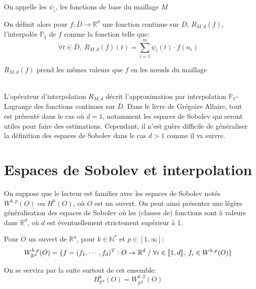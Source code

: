 \begin{remark}
On appelle les $\psi_i$, les fonctions de base du maillage $M$ 
\end{remark}

On définit alors pour $f: \bar{D} \rightarrow \mathbb{R}^d$ une fonction continue sur $D$, $R_{M,d}(f)$, l'interpolée $\mathbb{P}_1$ de $f$
comme la fonction telle que:
\begin{equation}
  \label{ContiInterpol}
  \forall t \in \bar{D}, \; R_{M,d}(f)(t) = \displaystyle\sum_{i=1}^m \psi_i (t)\cdot f(n_i)
\end{equation}

\begin{remark}
  $R_{M,d}(f)$ prend les mêmes valeurs que $f$ en les n\oe uds du maillage
\end{remark}
~\\
L'opérateur d'interpolation $R_{M,d}$ décrit l'approximation par interpolation $\mathbb{P}_1$-Lagrange des fonctions continues sur $\bar{D}$.
Dans le livre de Grégoire Allaire, tout est présenté dans le cas où $d = 1$, notamment les espaces de Sobolev qui seront utiles
pour faire des estimations. Cependant, il n'est guère difficile de généraliser la définition des espaces de Sobolev dans le cas $d > 1$ comme il va suivre.

\section{Espaces de Sobolev et interpolation}

On suppose que le lecteur est familier avec les espaces de Sobolev
notés $W^{k,p}(O)$ ou $H^{k}(O)$, où $O$ est un ouvert. On peut ainsi présenter une légère généralisation des espaces de Sobolev où
les (classes de) fonctions sont à valeurs dans $\mathbb{R}^d$, où $d$ est
éventuellement strictement supérieur à 1.

\begin{definition}
Pour $O$ un ouvert de $\mathbb{R}^n$, pour $k \in \mathbb{N}^{*}$ et $p \in [1,\infty]$:
\begin{equation*}
  W^{k,p}_{\mathbb{R}^d}(O) = \{ f = (f_1, \cdots, f_d)^{T}: O \rightarrow \mathbb{R}^d \; /\; \forall i \in \llbracket 1,d \rrbracket, \; f_i \in W^{k,p}(O) \}\\
\end{equation*}
\end{definition}
\noindent On se servira par la suite surtout de cet ensemble:
\begin{equation*}
  H^{k}_{\mathbb{R}^d}(O) = W^{k,2}_{\mathbb{R}^d}(O)
\end{equation*}

